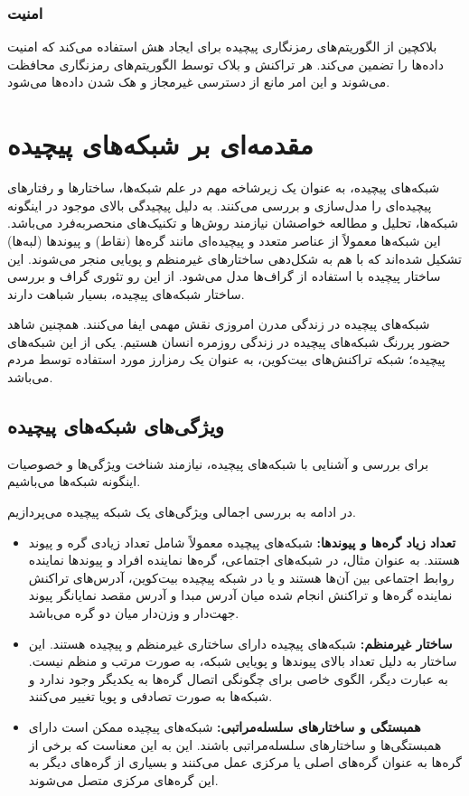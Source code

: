 \subsubsection{امنیت}
بلاکچین از الگوریتم‌های رمزنگاری پیچیده برای ایجاد هش استفاده می‌کند که امنیت داده‌ها را تضمین می‌کند. هر تراکنش و بلاک توسط الگوریتم‌های رمزنگاری محافظت می‌شوند و این امر مانع از دسترسی غیرمجاز و هک شدن داده‌ها می‌شود.


\section{مقدمه‌ای بر شبکه‌های پیچیده} 
شبکه‌های پیچیده، به عنوان یک زیرشاخه مهم در علم شبکه‌ها، ساختارها و رفتارهای پیچیده‌ای را مدل‌سازی و بررسی می‌کنند. به دلیل پیچیدگی بالای موجود در اینگونه شبکه‌ها، تحلیل و مطالعه خواصشان نیازمند روش‌ها و تکنیک‌های منحصربه‌فرد می‌باشد. این شبکه‌ها معمولاً از عناصر متعدد و پیچیده‌ای مانند گره‌ها (نقاط) و پیوندها (لبه‌ها) تشکیل شده‌اند که با هم به شکل‌دهی ساختارهای غیرمنظم و پویایی منجر می‌شوند. این ساختار پیچیده با استفاده از گراف‌ها مدل می‌شود. از این رو تئوری گراف و بررسی ساختار شبکه‌های پیچیده، بسیار شباهت دارند.

شبکه‌های پیچیده در زندگی مدرن امروزی نقش مهمی ایفا می‌کنند. همچنین شاهد حضور پررنگ شبکه‌های پیچیده در زندگی روزمره انسان هستیم. یکی از این شبکه‌های پیچیده؛ شبکه تراکنش‌های بیت‌کوین، به عنوان یک رمزارز مورد استفاده توسط مردم می‌باشد.

\subsection{ویژگی‌های شبکه‌های پیچیده}
برای بررسی و آشنایی با شبکه‌های پیچیده، نیازمند شناخت ویژگی‌ها و خصوصیات اینگونه شبکه‌ها می‌باشیم.

در ادامه به بررسی اجمالی ویژگی‌های یک شبکه پیچیده می‌پردازیم.
\begin{itemize}
    \item \textbf{تعداد زیاد گره‌ها و پیوندها:} شبکه‌های پیچیده معمولاً شامل تعداد زیادی گره و پیوند هستند. به عنوان مثال، در شبکه‌های اجتماعی، گره‌ها نماینده افراد و پیوندها نماینده روابط اجتماعی بین آن‌ها هستند و یا در شبکه پیچیده بیت‌کوین، آدرس‌های تراکنش نماینده گره‌ها و تراکنش انجام شده میان آدرس مبدا و آدرس مقصد نمایانگر پیوند جهت‌دار و وزن‌دار میان دو گره می‌باشد.
    
    \item \textbf{ساختار غیرمنظم:} شبکه‌های پیچیده دارای ساختاری غیرمنظم و پیچیده هستند. این ساختار به دلیل تعداد بالای پیوندها و پویایی شبکه، به صورت مرتب و منظم نیست. به عبارت دیگر، الگوی خاصی برای چگونگی اتصال گره‌ها به یکدیگر وجود ندارد و شبکه‌ها به صورت تصادفی و پویا تغییر می‌کنند.
    
    \item \textbf{همبستگی و ساختارهای سلسله‌مراتبی:} شبکه‌های پیچیده ممکن است دارای همبستگی‌ها و ساختارهای سلسله‌مراتبی باشند. این به این معناست که برخی از گره‌ها به عنوان گره‌های اصلی یا مرکزی عمل می‌کنند و بسیاری از گره‌های دیگر به این گره‌های مرکزی متصل می‌شوند.
\end{itemize}

